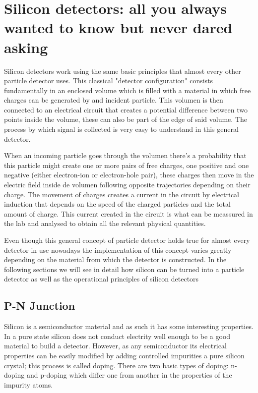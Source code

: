 \chapter{Silicon detectors: all you always wanted to know but never dared asking} %
\label{cha:simulator_development}

Silicon detectors work using the same basic principles that almost every other particle detector uses. This classical "detector configuration" consists fundamentally in an enclosed volume which is filled with a material in which free charges can be generated by and incident particle. This volumen is then connected to an electrical circuit that creates a  potential difference between two points inside the volume, these can also be part of the edge of said volume. The process by which signal is collected is very easy to understand in this general detector.

When an incoming particle goes through the volumen there's a probability that this particle might create one or more pairs of free charges, one positive and one negative (either electron-ion or electron-hole pair), these charges then move in the electric field inside de volumen following opposite trajectories depending on their charge. The movement of charges creates a current in the circuit by electrical induction that depends on the speed of the charged particles and the total amount of charge. This current created in the circuit is what can be meassured in the lab and analysed to obtain all the relevant physical quantities.

Even though this general concept of particle detector holds true for almost every detector in use nowadays the implementation of this concept varies greatly depending on the material from which the detector is constructed. In the following sections we will see in detail how silicon can be turned into a particle detector as well as the operational principles of silicon detectors

\section{P-N Junction}

Silicon is a semiconductor material and as such it has some interesting properties. In a pure state silicon does not conduct electrity well enough to be a good material to build a detector. However, as any semiconductor its electrical properties can be easily modified by adding controlled impurities a pure silicon crystal; this process is called doping. There are two basic types of doping: n-doping and p-doping which differ one from another in the properties of the impurity atoms.

